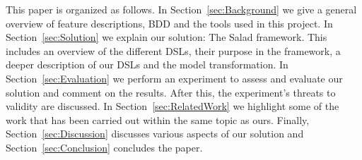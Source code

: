 This paper is organized as follows.
In Section~\ref{sec:Background} we give a general overview of feature descriptions, BDD and the tools used in this project. 
In Section~\ref{sec:Solution} we explain our solution: The Salad framework.
This includes an overview of the different DSLs, their purpose in the framework, a deeper description of our DSLs and the model transformation.
In Section~\ref{sec:Evaluation} we perform an experiment to assess and evaluate our solution and comment on the results.
After this, the experiment's threats to validity are discussed.
In Section~\ref{sec:RelatedWork} we highlight some of the work that has been carried out within the same topic as ours.
Finally, Section~\ref{sec:Discussion} discusses various aspects of our solution and Section~\ref{sec:Conclusion} concludes the paper.


